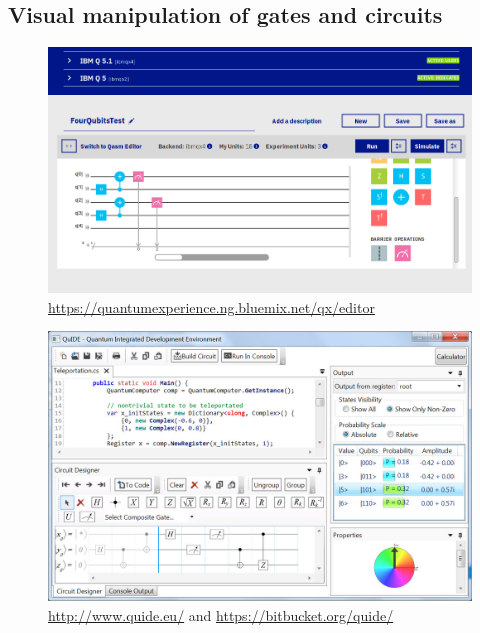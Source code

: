 \documentclass[a4paper,11pt]{article}
\begin{document}
\subsection{Visual manipulation of gates and circuits}

\begin{figure}[ht!]
\centering
\includegraphics[width=\textwidth]{../slides/pics/ibm-q-experience-composer.png}
\caption{\url{https://quantumexperience.ng.bluemix.net/qx/editor}}
\end{figure}

\begin{figure}[ht!]
\centering
\includegraphics[width=\textwidth]{../slides/pics/QuIDE_GUI.jpg}
\caption{\url{http://www.quide.eu/} and 
\url{https://bitbucket.org/quide/}}
\end{figure}
     
\end{document}
